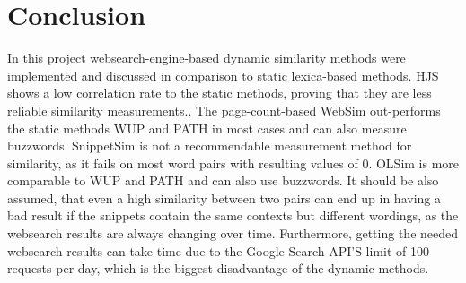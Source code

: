 \documentclass[conference]{IEEEtran}
\begin{document}
\section{Conclusion}\label{sec:conclusion}

In this project websearch-engine-based dynamic similarity methods were implemented and discussed in comparison to static lexica-based methods.  HJS shows a low correlation rate to the static methods, proving that they are less reliable similarity measurements.. The page-count-based WebSim out-performs the static methods WUP and PATH in most cases and can also measure buzzwords. SnippetSim is not a recommendable measurement method for similarity, as it fails on most word pairs with resulting values of 0. OLSim is more comparable to WUP and PATH and can also use buzzwords. It should be also assumed, that even a high similarity between two pairs can end up in having a bad result if the snippets contain the same contexts but different wordings, as the websearch results are always changing over time. Furthermore, getting the needed websearch results can take time due to the Google Search API'S limit of 100 requests per day, which is the biggest disadvantage of the dynamic methods.

 

\end{document}
